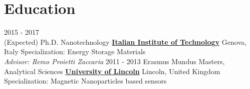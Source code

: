 \documentclass[letterpaper]{twentysecondcv} %
\begin{document}
\makeprofile %
    {\Huge\headingfont\color{headercolor}\cvjobtitle}




\section{Education}



\begin{twenty} %
	\twentyitem
    	{2015 - 2017 \\ (Expected)}
        {Ph.D. Nanotechnology}
        {\href{https://www.iit.it/}{\textbf{Italian Institute of Technology}}}
        {Genova, Italy}
        {Specialization: Energy Storage Materials
        \\ \textit{Advisor: Remo Proietti Zaccaria}}
	\twentyitem
    	{2011 - 2013}
        {Erasmus Mundus Masters, Analytical Sciences}
        {\href{https://www.lincoln.ac.uk/home/}{\textbf{University of Lincoln}}}
        {Lincoln, United Kingdom}
        {Specialization: Magnetic Nanoparticles based sensors}
\end{twenty}
\end{document}

